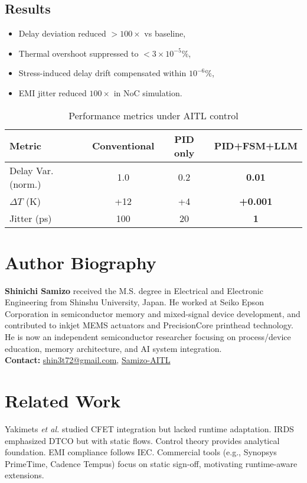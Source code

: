 \documentclass[conference]{IEEEtran}
\begin{document}
\subsection{Results}
\begin{itemize}
  \item Delay deviation reduced $>100\times$ vs baseline,
  \item Thermal overshoot suppressed to $<3\times 10^{-5}\%$,
  \item Stress-induced delay drift compensated within $10^{-6}\%$,
  \item EMI jitter reduced $100\times$ in NoC simulation.
\end{itemize}

\begin{table}[t]
\centering
\caption{Performance metrics under AITL control}
\label{tab:perf}
\begin{tabular}{lccc}
\hline
Metric & Conventional & PID only & PID+FSM+LLM \\
\hline
Delay Var. (norm.) & 1.0 & 0.2 & \textbf{0.01} \\
$\Delta T$ (K)     & +12 & +4  & \textbf{+0.001} \\
Jitter (ps)        & 100 & 20  & \textbf{1} \\
\hline
\end{tabular}
\end{table}




\section*{Author Biography}
\noindent\textbf{Shinichi Samizo}
received the M.S. degree in Electrical and Electronic Engineering from Shinshu University, Japan.
He worked at Seiko Epson Corporation in semiconductor memory and mixed-signal device development, and contributed to inkjet MEMS actuators and PrecisionCore printhead technology.
He is now an independent semiconductor researcher focusing on process/device education, memory architecture, and AI system integration.\\[2pt]
\textbf{Contact:} \href{mailto:shin3t72@gmail.com}{shin3t72@gmail.com},
\href{https://github.com/Samizo-AITL}{Samizo-AITL}

\section{Related Work}
Yakimets \textit{et al.} studied CFET integration but lacked runtime adaptation.
IRDS emphasized DTCO but with static flows.
Control theory provides analytical foundation.
EMI compliance follows IEC.
Commercial tools (e.g., Synopsys PrimeTime, Cadence Tempus) focus on static sign-off, motivating runtime-aware extensions.
\end{document}
